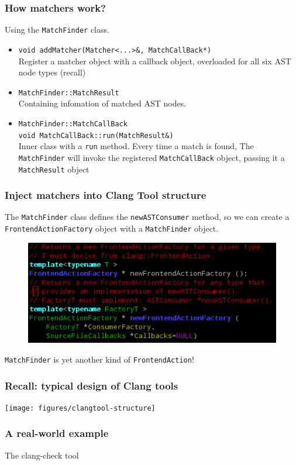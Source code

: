 \documentclass[]{beamer}
\begin{document}
\begin{frame}
  \frametitle{How matchers work?}
  Using the \texttt{MatchFinder} class.
  \begin{itemize}
    \item<1-> \texttt{void addMatcher(Matcher<...>\&, MatchCallBack*)}\\
      Register a matcher object with a callback object,
      overloaded for all six AST node types (recall)
    \item<2-> \texttt{MatchFinder::MatchResult}\\
      Containing infomation of matched AST nodes.
    \item<3-> \texttt{MatchFinder::MatchCallBack}\\
      \texttt{void MatchCallBack::run(MatchResult\&)}\\
      Inner class with a \texttt{run} method. Every time a match is found,
      The \texttt{MatchFinder} will invoke the registered \texttt{MatchCallBack} object,
      passing it a \texttt{MatchResult} object
  \end{itemize}
\end{frame}

\begin{frame}
  \frametitle{Inject matchers into Clang Tool structure}
  The \texttt{MatchFinder} class defines the \texttt{newASTConsumer} method,
  so we can create a \texttt{FrontendActionFactory} object with a \texttt{MatchFinder} object.
  \pause
  \begin{figure}
    \includegraphics[width=.8\textwidth]{figures/createfrontendfactory}
  \end{figure}
  \pause
  \alert{\texttt{MatchFinder} is yet another kind of \texttt{FrontendAction}!}
\end{frame}

\begin{frame}
  \frametitle{Recall: typical design of Clang tools}
  \centerline{\texttt{[image: figures/clangtool-structure]}}
\end{frame}

\begin{frame}
  \frametitle{A real-world example}
  \centerline{The \alert{clang-check} tool}
\end{frame}
\end{document}
